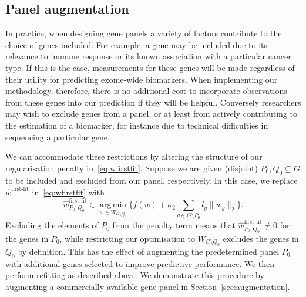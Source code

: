 \documentclass[12pt]{article}
\DeclareMathOperator*{\argmin}{arg\,min}
\begin{document}
\subsection{Panel augmentation \label{sec:panelaugmentation}}
In practice, when designing gene panels a variety of factors contribute to the choice of genes included. For example, a gene may be included due to its relevance to immune response or its known association with a particular cancer type. If this is the case, measurements for these genes will be made regardless of their utility for predicting exome-wide biomarkers. When implementing our methodology, therefore, there is no additional cost to incorporate observations from these genes into our prediction if they will be helpful. Conversely researchers may wish to exclude genes from a panel, or at least from actively contributing to the estimation of a biomarker, for instance due to technical difficulties in sequencing a particular gene. 

We can accommodate these restrictions by altering the structure of our regularisation penalty in~\eqref{eq:wfirstfit}.  Suppose we are given (disjoint) $P_0, Q_0 \subseteq G$ to be included and excluded from our panel, respectively. In this case, we replace $\hat{w}^{\text{first-fit}}$ in~\eqref{eq:wfirstfit} with 
\begin{equation} \label{eq:augment}
\hat{w}_{P_0, Q_0}^{\text{first-fit}} \in \argmin\limits_{w \in W_{G \setminus Q_0}} \bigl\{ f(w) + \kappa_2 \sum_{g \in G\setminus P_0} l_g \|w_g\|_2 \bigr\}.  
\end{equation}
Excluding the elements of $P_0$ from the penalty term means that $\hat{w}_{P_0, Q_0}^{\text{first-fit}} \neq 0$ for the genes in $P_0$, while restricting our optimisation to $W_{G \setminus Q_0}$ excludes the genes in $Q_0$ by definition. This has the effect of augmenting the predetermined panel $P_0$ with additional genes selected to improve predictive performance. We then perform refitting as described above. We demonstrate this procedure by augmenting a commercially available gene panel in Section~\ref{sec:augmentation}.
\end{document}
